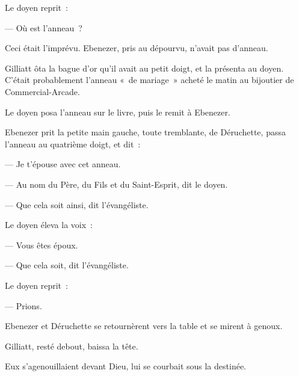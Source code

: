 \documentclass[french,twoside]{book} %
\begin{document}
Le doyen reprit :\par
— Où est l’anneau ?\par
Ceci était l’imprévu. Ebenezer, pris au dépourvu, n’avait pas d’anneau.\par
Gilliatt ôta la bague d’or qu’il avait au petit doigt, et la présenta au doyen. C’était probablement l’anneau « de mariage » acheté le matin au bijoutier de Commercial-Arcade.\par
Le doyen posa l’anneau sur le livre, puis le remit à Ebenezer.\par
Ebenezer prit la petite main gauche, toute tremblante, de Déruchette, passa l’anneau au quatrième doigt, et dit :\par
— Je t’épouse avec cet anneau.\par
— Au nom du Père, du Fils et du Saint-Esprit, dit le doyen.\par
— Que cela soit ainsi, dit l’évangéliste.\par
Le doyen éleva la voix :\par
— Vous êtes époux.\par
— Que cela soit, dit l’évangéliste.\par
 Le doyen reprit :\par
— Prions.\par
Ebenezer et Déruchette se retournèrent vers la table et se mirent à genoux.\par
Gilliatt, resté debout, baissa la tête.\par
Eux s’agenouillaient devant Dieu, lui se courbait sous la destinée.
\end{document}
